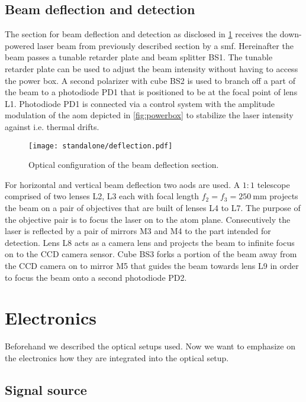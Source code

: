 \subsection{Beam deflection and detection}
\label{sec:deflection}

The section for beam deflection and detection as disclosed in
\cref{fig:deflection} receives the down-powered laser beam from previously
described section by a \gls{smf}. Hereinafter the beam passes a tunable
retarder plate and beam splitter BS1. The tunable retarder plate can be used
to adjust the beam intensity without having to access the power box.
A second polarizer with cube BS2 is used to branch off a part of the beam
to a photodiode PD1 that is positioned to be at the focal point of lens L1.
Photodiode PD1 is connected via a control system with the amplitude
modulation of the \gls{aom} depicted in \cref{fig:powerbox} to stabilize
the laser intensity against i.e. thermal drifts.

\begin{figure}[h]
  \centering
  \texttt{[image: standalone/deflection.pdf]}
  \caption{Optical configuration of the beam deflection section.}
  \label{fig:deflection}
\end{figure}

For horizontal and vertical beam deflection two \gls{aod}s are used. A $1:1$
telescope comprised of two lenses L2, L3
each with focal length $f_2=f_3=\SI{250}{\milli\meter}$ projects the beam
on a pair of objectives that are built of lenses L4 to L7. The purpose of the
objective pair is to focus the laser on to the atom plane.
Consecutively the laser is reflected by a pair of mirrors M3 and M4 to the
part intended for detection. Lens L8 acts as a camera lens and projects the
beam to infinite focus on to the CCD camera sensor. Cube BS3 forks a portion
of the beam away from the CCD camera on to mirror M5 that guides the beam
towards lens L9 in order to focus the beam onto a second photodiode PD2.

\section{Electronics}

Beforehand we described the optical setups used. Now we want to emphasize
on the electronics how they are integrated into the optical setup.

\subsection{Signal source}

